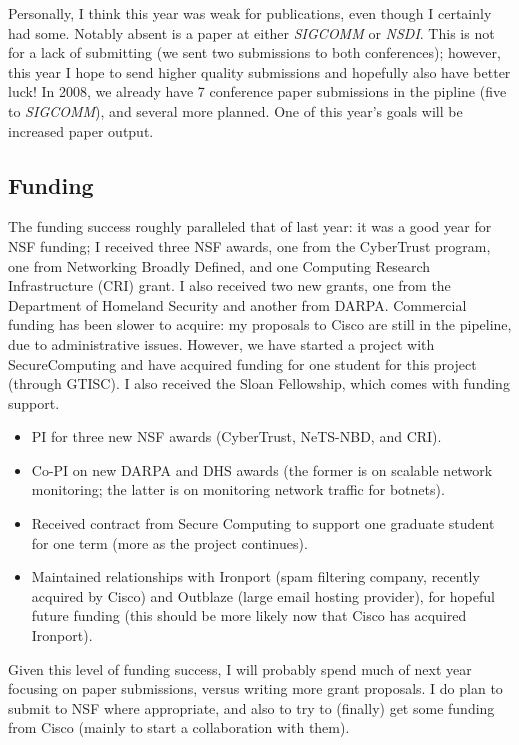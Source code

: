 \begin{sloppypar}
\noindent
Personally, I think this year was weak for publications, even though I
certainly had some.  Notably absent is a paper at either {\em SIGCOMM}
or {\em NSDI}. This is not for a lack of submitting (we sent two
submissions to both conferences); however, this year I hope to send
higher quality submissions and hopefully also have better luck!  In
2008, we already have 7 conference paper submissions in the pipline
(five to {\em SIGCOMM}), and several more planned.  One of this year's
goals will be increased paper output.

\subsection*{Funding}

The funding success roughly paralleled that of last year: it was a good
year for NSF funding; I received three NSF awards, one from the
CyberTrust program, one from Networking Broadly Defined, and one
Computing Research Infrastructure (CRI) grant.  I also received two new
grants, one from the Department of Homeland Security and another from
DARPA.  Commercial funding has been slower to acquire: my proposals to
Cisco are still in the pipeline, due to administrative issues.  However,
we have started a project with SecureComputing and have acquired funding
for one student for this project (through GTISC).  I also received the
Sloan Fellowship, which comes with funding support.

\begin{itemize}
\itemsep=-1pt
\item PI for three new NSF awards (CyberTrust, NeTS-NBD, and CRI).
\item Co-PI on new DARPA and DHS awards (the former is on scalable
  network monitoring; the latter is on monitoring network traffic for
  botnets).
\item Received contract from Secure Computing to support one graduate
  student for one term (more as the project continues).
\item Maintained relationships with Ironport (spam filtering
  company, recently acquired by Cisco) and Outblaze (large email hosting
  provider), for hopeful future funding (this should be more likely now
  that Cisco has acquired Ironport).
\end{itemize}

\noindent
Given this level of funding success, I will probably spend much of next
year focusing on paper submissions, versus writing more grant
proposals.  I do plan to submit to NSF where appropriate, and also to
try to (finally) get some funding from Cisco (mainly to start a
collaboration with them).


\end{sloppypar}

